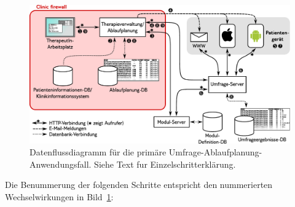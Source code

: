 \documentclass[DIV=calc,paper=a4,fontsize=11pt,twocolumn]{scrartcl}
\begin{document}
\begin{figure}
  \begin{center}
    \includegraphics[width=\textwidth]{flow-diagram-de}
  \end{center}
  \caption{Datenflussdiagramm für die primäre
    Umfrage-Ablaufplanung-Anwendungsfall. Siehe Text fur
    Einzelschritterklärung.}
  \label{fig:flow-diagram}
\end{figure}

Die Benummerung der folgenden Schritte entspricht den nummerierten
Wechselwirkungen in Bild~\ref{fig:flow-diagram}:
\end{document}

